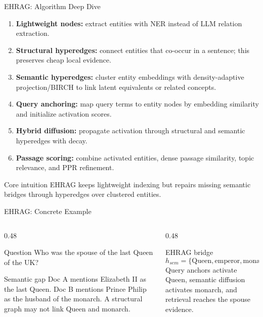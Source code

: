 
\begin{frame}{EHRAG: Algorithm Deep Dive}
\scriptsize
\begin{enumerate}
  \item \textbf{Lightweight nodes:} extract entities with NER instead of LLM relation extraction.
  \item \textbf{Structural hyperedges:} connect entities that co-occur in a sentence; this preserves cheap local evidence.
  \item \textbf{Semantic hyperedges:} cluster entity embeddings with density-adaptive projection/BIRCH to link latent equivalents or related concepts.
  \item \textbf{Query anchoring:} map query terms to entity nodes by embedding similarity and initialize activation scores.
  \item \textbf{Hybrid diffusion:} propagate activation through structural and semantic hyperedges with decay.
  \item \textbf{Passage scoring:} combine activated entities, dense passage similarity, topic relevance, and PPR refinement.
\end{enumerate}
\begin{block}{Core intuition}
EHRAG keeps lightweight indexing but repairs missing semantic bridges through hyperedges over clustered entities.
\end{block}
\end{frame}

\begin{frame}{EHRAG: Concrete Example}
\scriptsize
\begin{columns}[T,onlytextwidth]
  \begin{column}{0.48\textwidth}
    \begin{block}{Question}
      Who was the spouse of the last Queen of the UK?
    \end{block}
    \begin{block}{Semantic gap}
      Doc A mentions Elizabeth II as the last Queen. Doc B mentions Prince Philip as the husband of the monarch. A structural graph may not link Queen and monarch.
    \end{block}
  \end{column}
  \begin{column}{0.48\textwidth}
    \begin{block}{EHRAG bridge}
      \[
      h_{sem}=\{\text{Queen}, \text{emperor}, \text{monarch}, ...\}
      \]
      Query anchors activate Queen, semantic diffusion activates monarch, and retrieval reaches the spouse evidence.
    \end{block}
  \end{column}
\end{columns}
\end{frame}

